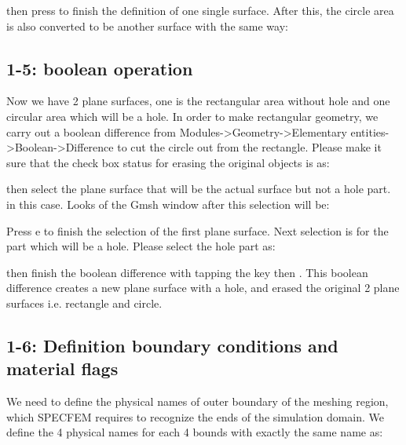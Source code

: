 \documentclass[letterpaper,10pt,english]{sphinxmanual}
\begin{document}
then press  to finish the definition of one single surface.
After this, the circle area is also converted to be another surface with the same way:




\subsection{1-5: boolean operation}
\label{\detokenize{meshing:boolean-operation}}
Now we have 2 plane surfaces, one is the rectangular area without hole and one circular area which will be a hole.
In order to make rectangular geometry, we carry out a boolean difference from Modules-\textgreater{}Geometry-\textgreater{}Elementary entities-\textgreater{}Boolean-\textgreater{}Difference to cut the circle out from the rectangle. Please make it sure that the check box status for erasing the original objects is as:



then select the plane surface that will be the actual surface but not a hole part.  in this case. Looks of the Gmsh window after this selection will be:



Press e to finish the selection of the first plane surface.
Next selection is for the part which will be a hole. Please select the hole part  as:



then finish the boolean difference with tapping the key  then .
This boolean difference creates a new plane surface with a hole, and erased the original 2 plane surfaces i.e. rectangle and circle.


\subsection{1-6: Definition boundary conditions and material flags}
\label{\detokenize{meshing:definition-boundary-conditions-and-material-flags}}
We need to define the physical names of outer boundary of the meshing region, which SPECFEM requires to recognize the ends of the simulation domain. We define the 4 physical names for each 4 bounds with exactly the same name as:

\begin{sphinxVerbatim}[commandchars=\\\{\}]
  
        
      
       
         
\end{sphinxVerbatim}
\end{document}
